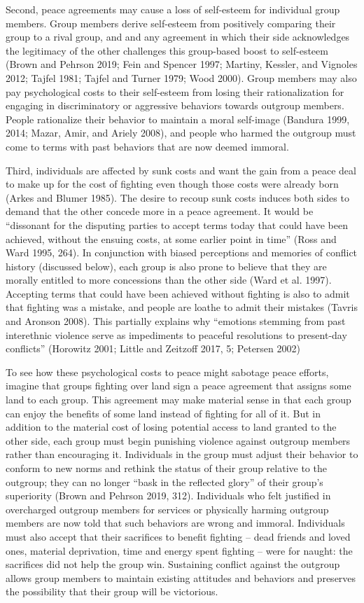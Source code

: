 \documentclass[11pt]{article}
\begin{document}
Second, peace agreements may cause a loss of self-esteem for individual
group members. Group members derive self-esteem from positively
comparing their group to a rival group, and and any agreement in which
their side acknowledges the legitimacy of the other challenges this
group-based boost to self-esteem (Brown and Pehrson 2019; Fein and
Spencer 1997; Martiny, Kessler, and Vignoles 2012; Tajfel 1981; Tajfel
and Turner 1979; Wood 2000). Group members may also pay psychological
costs to their self-esteem from losing their rationalization for
engaging in discriminatory or aggressive behaviors towards outgroup
members. People rationalize their behavior to maintain a moral
self-image (Bandura 1999, 2014; Mazar, Amir, and Ariely 2008), and
people who harmed the outgroup must come to terms with past behaviors
that are now deemed immoral.

Third, individuals are affected by sunk costs and want the gain from a
peace deal to make up for the cost of fighting even though those costs
were already born (Arkes and Blumer 1985). The desire to recoup sunk
costs induces both sides to demand that the other concede more in a
peace agreement. It would be ``dissonant for the disputing parties to
accept terms today that could have been achieved, without the ensuing
costs, at some earlier point in time'' (Ross and Ward 1995, 264). In
conjunction with biased perceptions and memories of conflict history
(discussed below), each group is also prone to believe that they are
morally entitled to more concessions than the other side (Ward et al.
1997). Accepting terms that could have been achieved without fighting is
also to admit that fighting was a mistake, and people are loathe to
admit their mistakes (Tavris and Aronson 2008). This partially explains
why ``emotions stemming from past interethnic violence serve as
impediments to peaceful resolutions to present-day conflicts'' (Horowitz
2001; Little and Zeitzoff 2017, 5; Petersen 2002)

To see how these psychological costs to peace might sabotage peace
efforts, imagine that groups fighting over land sign a peace agreement
that assigns some land to each group. This agreement may make material
sense in that each group can enjoy the benefits of some land instead of
fighting for all of it. But in addition to the material cost of losing
potential access to land granted to the other side, each group must
begin punishing violence against outgroup members rather than
encouraging it. Individuals in the group must adjust their behavior to
conform to new norms and rethink the status of their group relative to
the outgroup; they can no longer ``bask in the reflected glory'' of
their group's superiority (Brown and Pehrson 2019, 312). Individuals who
felt justified in overcharged outgroup members for services or
physically harming outgroup members are now told that such behaviors are
wrong and immoral. Individuals must also accept that their sacrifices to
benefit fighting -- dead friends and loved ones, material deprivation,
time and energy spent fighting -- were for naught: the sacrifices did
not help the group win. Sustaining conflict against the outgroup allows
group members to maintain existing attitudes and behaviors and preserves
the possibility that their group will be victorious.
\end{document}
